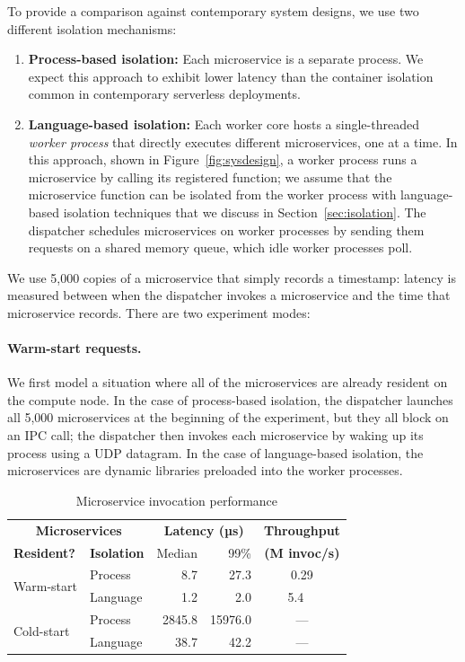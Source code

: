 To provide a comparison against contemporary system designs, we use two different
isolation mechanisms:
\begin{enumerate}
\item \textbf{Process-based isolation:} Each microservice is a separate process.
We expect this approach to exhibit lower latency than the container isolation common
in contemporary serverless deployments.
\item \textbf{Language-based isolation:} Each worker core hosts a single-threaded
\emph{worker process} that directly executes different microservices, one at a time.
In this approach, shown in Figure~\ref{fig:sysdesign}, a worker process runs a
microservice by calling its registered
function; we assume that the microservice function can be isolated from the
worker process with language-based isolation techniques that we discuss in
Section~\ref{sec:isolation}. The dispatcher schedules microservices on worker
processes by sending them
requests on a shared memory queue, which idle worker processes poll.
\end{enumerate}

\noindent
We use 5,000 copies of a microservice that simply records a timestamp:\@
latency is measured between when the dispatcher invokes a microservice
and the time that microservice records.  There are two experiment modes:

\paragraph{Warm-start requests.}
We first model a situation where all of the microservices are already resident on the
compute node.  In the case of process-based isolation, the dispatcher launches all
5,000 microservices at the beginning of the experiment, but they all block on an IPC
call; the dispatcher then invokes each microservice by waking up its process using a
UDP datagram.  In the case of language-based isolation, the microservices are
dynamic libraries preloaded into the worker processes.

\begin{table}
\begin{center}
\small
\begin{tabular}{@{}llrrc@{}}
  \multicolumn{2}{c}{\textbf{Microservices}} & \multicolumn{2}{c}{\textbf{Latency (µs)}} & \textbf{Throughput} \\
  \textbf{Resident?} & \textbf{Isolation} & Median & 99\% & \textbf{(M invoc/s)} \\
\midrule
\multirow{2}{*}{Warm-start} & Process & 8.7 & 27.3 & 0.29 \\
& Language & 1.2 & 2.0 & 5.4~~ \\
\midrule
\multirow{2}{*}{Cold-start} & Process & 2845.8 & 15976.0 & \multicolumn{1}{c}{---} \\
& Language & 38.7 & 42.2 & \multicolumn{1}{c}{---} \\
\end{tabular}
\caption{Microservice invocation performance}
\label{tab:invocperf}
\end{center}
\vspace{-12pt}
\end{table}

